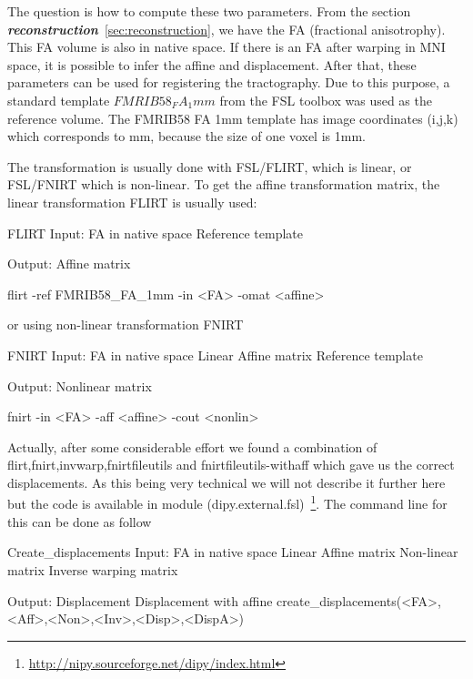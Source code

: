 The question is how to compute these two parameters. From the section \textbf{\textit{reconstruction}}~\ref{sec:reconstruction}, we have the FA (fractional anisotrophy). This FA volume is also in native space. If there is an FA after warping in MNI space, it is possible to infer the affine and displacement. After that, these parameters can be used for registering the tractography. Due to this purpose, a standard template $FMRIB58_FA_1mm$ from the FSL toolbox was used as the reference volume. The FMRIB58 FA 1mm template has image coordinates (i,j,k) which corresponds to mm, because the size of one voxel is 1mm.

The transformation is usually done with FSL/FLIRT, which is linear, or FSL/FNIRT  which is non-linear. To get the affine transformation matrix, the linear transformation FLIRT is usually used:

\begin{python}
FLIRT
Input:  FA in native space
        Reference template 
        
Output: Affine matrix

flirt -ref FMRIB58_FA_1mm  -in <FA> -omat  <affine>
\end{python} 

or using non-linear transformation FNIRT

\begin{python}
FNIRT
Input:  FA in native space
        Linear Affine matrix
        Reference template 
        
Output: Nonlinear matrix

fnirt -in <FA> -aff <affine> -cout <nonlin>
\end{python} 

Actually, after some considerable effort we found a combination of flirt,fnirt,invwarp,fnirtfileutils and fnirtfileutils-withaff which gave us the correct displacements. As this being very technical we will not describe it further here but the code is available in module  (dipy.external.fsl)~\footnote{\url{http://nipy.sourceforge.net/dipy/index.html}}. The command line for this can be done as follow

\begin{python}
Create_displacements
Input:  FA in native space
        Linear Affine matrix
        Non-linear matrix
        Inverse warping matrix     
                
Output: Displacement
        Displacement with affine
create_displacements(<FA>,<Aff>,<Non>,<Inv>,<Disp>,<DispA>)
\end{python} 

